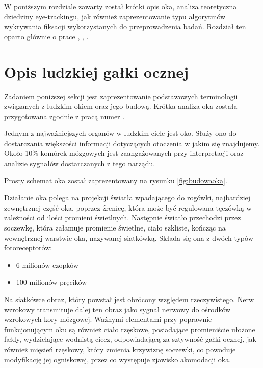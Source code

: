 \label{chapter:ch2}
W poniższym rozdziale zawarty został krótki opis oka, analiza teoretyczna dziedziny eye-trackingu, jak również zaprezentowanie typu algorytmów wykrywania fiksacji wykorzystanych do przeprowadzenia badań. Rozdział ten oparto głównie o prace \cite{Main}, \cite{EvaluationMethodology}, \cite{MachineLearning}.
\section{Opis ludzkiej gałki ocznej}
Zadaniem poniższej sekcji jest zaprezentowanie podstawowych terminologii związanych z ludzkim okiem oraz jego budową. Krótka analiza oka została przygotowana zgodnie z pracą numer \cite{EvaluationMethodology}.\par
Jednym z najważniejszych organów w ludzkim ciele jest oko. Służy ono do dostarczania większości informacji dotyczących otoczenia w jakim się znajdujemy. Około 10\% komórek mózgowych jest zaangażowanych przy interpretacji oraz analizie sygnałów dostarczanych z tego narządu.\par
Prosty schemat oka został zaprezentowany na rysunku \ref{fig:budowaoka}.\par
Działanie oka polega na projekcji światła wpadającego do rogówki, najbardziej zewnętrznej część oka, poprzez źrenicę, która może być regulowana tęczówką w zależności od ilości promieni świetlnych. Następnie światło przechodzi przez soczewkę, która załamuje promienie świetlne, ciało szkliste, kończąc na wewnętrznej warstwie oka, nazywanej siatkówką. Składa się ona z dwóch typów fotoreceptorów:
    \begin{itemize}
        \item 6 milionów czopków
        \item 100 milionów pręcików
    \end{itemize} 
Na siatkówce obraz, który powstał jest obrócony względem rzeczywistego. Nerw wzrokowy transmituje dalej ten obraz jako sygnał nerwowy do ośrodków wzrokowych kory mózgowej. Ważnymi elementami przy poprawnie funkcjonującym oku są również ciało rzęskowe, posiadające promieniście ułożone fałdy, wydzielające wodnistą ciecz, odpowiadającą za sztywność gałki ocznej, jak również mięsień rzęskowy, który zmienia krzywiznę soczewki, co powoduje modyfikację jej ogniskowej, przez co występuje zjawisko akomodacji oka.
